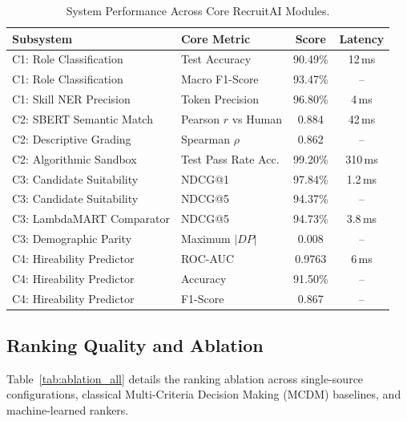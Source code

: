 \documentclass[conference]{IEEEtran}
\begin{document}
\begin{table}[htbp]
\caption{System Performance Across Core RecruitAI Modules.}
\begin{center}
\begin{tabular}{llcc}
\toprule
\textbf{Subsystem} & \textbf{Core Metric} & \textbf{Score} & \textbf{Latency} \\
\midrule
C1: Role Classification   & Test Accuracy        & 90.49\% & 12\,ms \\
C1: Role Classification   & Macro F1-Score       & 93.47\% & -- \\
C1: Skill NER Precision   & Token Precision      & 96.80\% & 4\,ms \\
\midrule
C2: SBERT Semantic Match  & Pearson $r$ vs Human & 0.884   & 42\,ms \\
C2: Descriptive Grading   & Spearman $\rho$      & 0.862   & -- \\
C2: Algorithmic Sandbox   & Test Pass Rate Acc.  & 99.20\% & 310\,ms \\
\midrule
C3: Candidate Suitability & NDCG@1               & 97.84\% & 1.2\,ms \\
C3: Candidate Suitability & NDCG@5               & 94.37\% & -- \\
C3: LambdaMART Comparator & NDCG@5               & 94.73\% & 3.8\,ms \\
C3: Demographic Parity    & Maximum $|DP|$       & 0.008   & -- \\
\midrule
C4: Hireability Predictor & ROC-AUC              & 0.9763  & 6\,ms \\
C4: Hireability Predictor & Accuracy             & 91.50\% & -- \\
C4: Hireability Predictor & F1-Score             & 0.867   & -- \\
\bottomrule
\end{tabular}
\label{tab:system_benchmark}
\end{center}
\end{table}

\subsection{Ranking Quality and Ablation}
Table~\ref{tab:ablation_all} details the ranking ablation across single-source configurations, classical Multi-Criteria Decision Making (MCDM) baselines, and machine-learned rankers.
\end{document}
